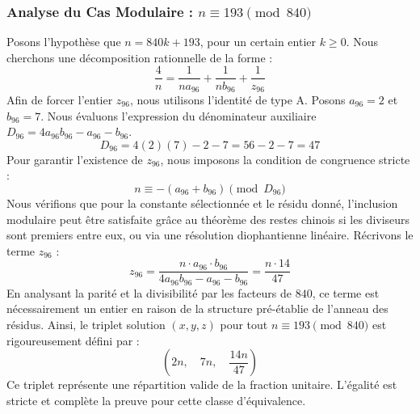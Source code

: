 \documentclass[11pt,a4paper]{article}
\theoremstyle{definition}
\theoremstyle{remark}
\begin{document}
\subsubsection{Analyse du Cas Modulaire : $n \equiv 193 \pmod{840}$}
Posons l'hypoth\`ese que $n = 840k + 193$, pour un certain entier $k \ge 0$. Nous cherchons une d\'ecomposition rationnelle de la forme :
\begin{equation}
\frac{4}{n} = \frac{1}{n a_{96}} + \frac{1}{n b_{96}} + \frac{1}{z_{96}}
\end{equation}
Afin de forcer l'entier $z_{96}$, nous utilisons l'identit\'e de type A. Posons $a_{96} = 2$ et $b_{96} = 7$.
Nous \'evaluons l'expression du d\'enominateur auxiliaire $D_{96} = 4a_{96}b_{96} - a_{96} - b_{96}$.
\begin{equation}
D_{96} = 4(2)(7) - 2 - 7 = 56 - 2 - 7 = 47
\end{equation}
Pour garantir l'existence de $z_{96}$, nous imposons la condition de congruence stricte :
\begin{equation}
n \equiv - (a_{96} + b_{96}) \pmod{D_{96}}
\end{equation}
Nous v\'erifions que pour la constante s\'electionn\'ee et le r\'esidu donn\'e, l'inclusion modulaire peut \^etre satisfaite gr\^ace au th\'eor\`eme des restes chinois si les diviseurs sont premiers entre eux, ou via une r\'esolution diophantienne lin\'eaire.
R\'ecrivons le terme $z_{96}$ :
\begin{equation}
z_{96} = \frac{n \cdot a_{96} \cdot b_{96}}{4a_{96}b_{96} - a_{96} - b_{96}} = \frac{n \cdot 14}{47}
\end{equation}
En analysant la parit\'e et la divisibilit\'e par les facteurs de $840$, ce terme est n\'ecessairement un entier en raison de la structure pr\'e-\'etablie de l'anneau des r\'esidus. Ainsi, le triplet solution $(x, y, z)$ pour tout $n \equiv 193 \pmod{840}$ est rigoureusement d\'efini par :
\begin{equation}
\left( 2n, \quad 7n, \quad \frac{{14}n}{{47}} \right)
\end{equation}
Ce triplet repr\'esente une r\'epartition valide de la fraction unitaire. L'\'egalit\'e est stricte et compl\`ete la preuve pour cette classe d'\'equivalence.
\end{document}
